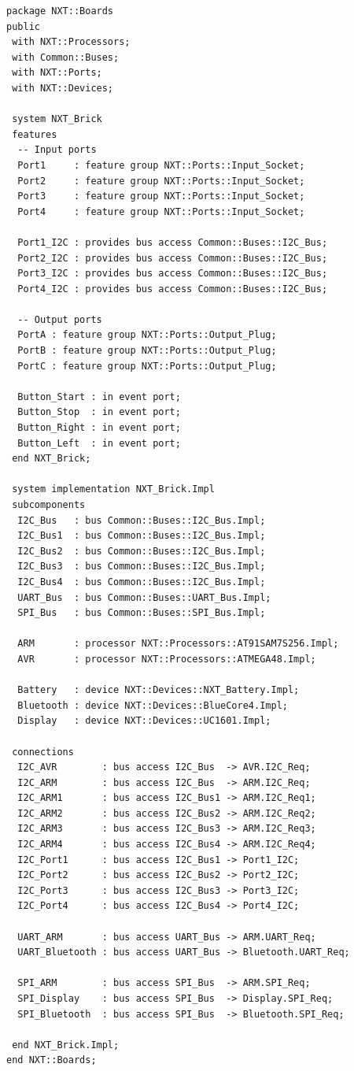
\begin{lstlisting}
package NXT::Boards
public
 with NXT::Processors;
 with Common::Buses;
 with NXT::Ports;
 with NXT::Devices;
 
 system NXT_Brick
 features
  -- Input ports
  Port1     : feature group NXT::Ports::Input_Socket;
  Port2     : feature group NXT::Ports::Input_Socket;
  Port3     : feature group NXT::Ports::Input_Socket;
  Port4     : feature group NXT::Ports::Input_Socket;
  
  Port1_I2C : provides bus access Common::Buses::I2C_Bus;
  Port2_I2C : provides bus access Common::Buses::I2C_Bus;
  Port3_I2C : provides bus access Common::Buses::I2C_Bus;
  Port4_I2C : provides bus access Common::Buses::I2C_Bus;
  
  -- Output ports
  PortA : feature group NXT::Ports::Output_Plug;
  PortB : feature group NXT::Ports::Output_Plug;
  PortC : feature group NXT::Ports::Output_Plug;
  
  Button_Start : in event port;
  Button_Stop  : in event port;
  Button_Right : in event port;
  Button_Left  : in event port;
 end NXT_Brick;
 
 system implementation NXT_Brick.Impl
 subcomponents
  I2C_Bus   : bus Common::Buses::I2C_Bus.Impl;
  I2C_Bus1  : bus Common::Buses::I2C_Bus.Impl;
  I2C_Bus2  : bus Common::Buses::I2C_Bus.Impl;
  I2C_Bus3  : bus Common::Buses::I2C_Bus.Impl;
  I2C_Bus4  : bus Common::Buses::I2C_Bus.Impl;
  UART_Bus  : bus Common::Buses::UART_Bus.Impl;
  SPI_Bus   : bus Common::Buses::SPI_Bus.Impl;
 
  ARM       : processor NXT::Processors::AT91SAM7S256.Impl;
  AVR       : processor NXT::Processors::ATMEGA48.Impl;
  
  Battery   : device NXT::Devices::NXT_Battery.Impl;
  Bluetooth : device NXT::Devices::BlueCore4.Impl;
  Display   : device NXT::Devices::UC1601.Impl;
  
 connections
  I2C_AVR        : bus access I2C_Bus  -> AVR.I2C_Req;
  I2C_ARM        : bus access I2C_Bus  -> ARM.I2C_Req;
  I2C_ARM1       : bus access I2C_Bus1 -> ARM.I2C_Req1;
  I2C_ARM2       : bus access I2C_Bus2 -> ARM.I2C_Req2;
  I2C_ARM3       : bus access I2C_Bus3 -> ARM.I2C_Req3;
  I2C_ARM4       : bus access I2C_Bus4 -> ARM.I2C_Req4;
  I2C_Port1      : bus access I2C_Bus1 -> Port1_I2C;
  I2C_Port2      : bus access I2C_Bus2 -> Port2_I2C;
  I2C_Port3      : bus access I2C_Bus3 -> Port3_I2C;
  I2C_Port4      : bus access I2C_Bus4 -> Port4_I2C;
  
  UART_ARM       : bus access UART_Bus -> ARM.UART_Req;
  UART_Bluetooth : bus access UART_Bus -> Bluetooth.UART_Req;
  
  SPI_ARM        : bus access SPI_Bus  -> ARM.SPI_Req;
  SPI_Display    : bus access SPI_Bus  -> Display.SPI_Req;
  SPI_Bluetooth  : bus access SPI_Bus  -> Bluetooth.SPI_Req;
  
 end NXT_Brick.Impl;
end NXT::Boards;
\end{lstlisting}

